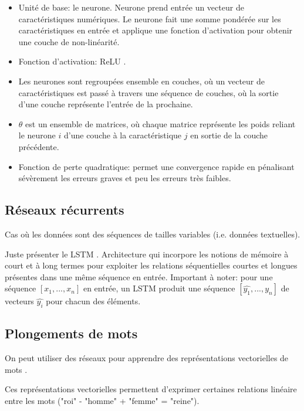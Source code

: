\begin{itemize}
    \item Unité de base: le neurone. Neurone prend entrée un vecteur de caractéristiques numériques.
          Le neurone fait une somme pondérée sur les caractéristiques en entrée et applique une
          fonction d'activation pour obtenir une couche de non-linéarité.
    \item Fonction d'activation: ReLU \citep{xu2015empirical}.
    \item Les neurones sont regroupées ensemble en couches, où un vecteur de caractéristiques
          est passé à travers une séquence de couches, où la sortie d'une couche représente l'entrée
          de la prochaine.
    \item $\theta$ est un ensemble de matrices, où chaque matrice représente les poids
          reliant le neurone $i$ d'une couche à la caractéristique $j$ en sortie de la couche précédente.
    \item Fonction de perte quadratique: permet une convergence rapide en pénalisant sévèrement
          les erreurs graves et peu les erreurs très faibles.
\end{itemize}

\subsection{Réseaux récurrents}

Cas où les données sont des séquences de tailles variables (i.e. données
textuelles).

Juste présenter le LSTM \citep{iet:/content/conferences/10.1049/cp_19991218}.
Architecture qui incorpore les notions de mémoire à court et à long termes pour
exploiter les relations séquentielles courtes et longues présentes dans une même
séquence en entrée.
Important à noter: pour une séquence $[x_1, ..., x_n]$ en entrée, un LSTM produit une
séquence $[\hat{y_1}, ..., \hat{y_n}]$ de vecteurs $\hat{y_i}$ pour chacun des éléments.

\subsection{Plongements de mots}
On peut utiliser des réseaux pour apprendre des représentations
vectorielles de mots \citep{NIPS2013_9aa42b31,pennington2014glove}.

Ces représentations vectorielles permettent d'exprimer certaines
relations linéaire entre les mots ("roi" - "homme" + "femme" = "reine").

